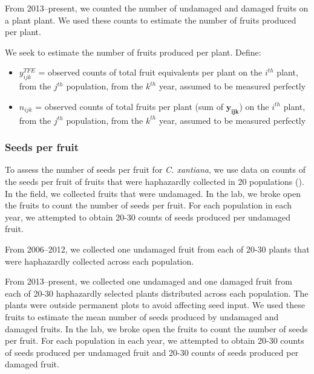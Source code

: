 \documentclass[12pt, oneside, titlepage]{article}   	%
\begin{document}
From 2013--present, we counted the number of undamaged and damaged fruits on a plant plant. We used these counts to estimate the number of fruits produced per plant.

We seek to estimate the number of fruits produced per plant. Define: 

\begin{itemize}

	\item $y^{TFE}_{ijk}$ = observed counts of total fruit equivalents per plant on the $i^{th}$ plant, from the $j^{th}$ population, from the $k^{th}$ year, assumed to be measured perfectly
	\item $n_{ijk}$ = observed counts of total fruits per plant (sum of $\bm{y_{ijk}}$) on the $i^{th}$ plant, from the $j^{th}$ population, from the $k^{th}$ year, assumed to be measured perfectly
\end{itemize}

\subsubsection*{Seeds per fruit}

To assess the number of seeds per fruit for \textit{C. xantiana}, we use data on counts of the seeds per fruit of fruits that were haphazardly collected in 20 populations (\cite{eckhart2011}). In the field, we collected fruits that were undamaged. In the lab, we broke open the fruits to count the number of seeds per fruit. For each population in each year, we attempted to obtain 20-30 counts of seeds produced per undamaged fruit. 

From 2006--2012, we collected one undamaged fruit from each of 20-30 plants that were haphazardly collected across each population.

From 2013--present, we collected one undamaged and one damaged fruit from each of 20-30 haphazardly selected plants distributed across each population. The plants were outside permanent plots to avoid affecting seed input. We used these fruits to estimate the mean number of seeds produced by undamaged and damaged fruits. In the lab, we broke open the fruits to count the number of seeds per fruit. For each population in each year, we attempted to obtain 20-30 counts of seeds produced per undamaged fruit and  20-30 counts of seeds produced per damaged fruit. 
\end{document}
